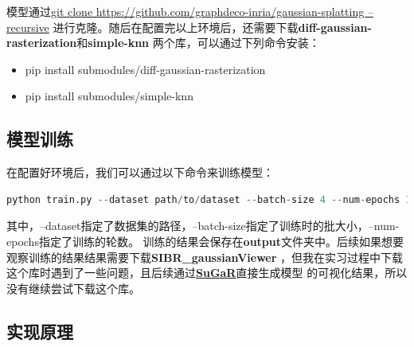\documentclass{nwputhesis}
\begin{document}
\indent
模型通过\underline{git clone https://github.com/graphdeco-inria/gaussian-splatting --recursive}
进行克隆。随后在配置完以上环境后，还需要下载\textbf{diff-gaussian-rasterization}和\textbf{simple-knn}
两个库，可以通过下列命令安装：
\begin{itemize}
    \item pip install submodules/diff-gaussian-rasterization
    \item pip install submodules/simple-knn
\end{itemize}
\subsection{模型训练}
\indent
在配置好环境后，我们可以通过以下命令来训练模型：
\begin{lstlisting}[language=python]
    python train.py --dataset path/to/dataset --batch-size 4 --num-epochs 100
\end{lstlisting}

\indent
其中，--dataset指定了数据集的路径，--batch-size指定了训练时的批大小，--num-epochs指定了训练的轮数。
训练的结果会保存在\textbf{output}文件夹中。后续如果想要观察训练的结果结果需要下载\textbf{SIBR\_gaussianViewer}
，但我在实习过程中下载这个库时遇到了一些问题，且后续通过\textbf{\hyperlink{sugar}{SuGaR}}直接生成模型
的可视化结果，所以没有继续尝试下载这个库。\\

\subsection{实现原理}
\end{document}

